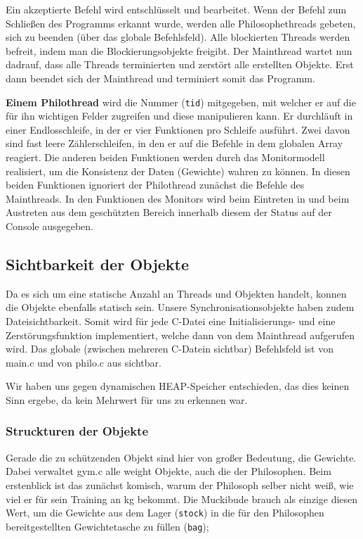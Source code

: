 \documentclass[
   draft=false
  ,paper=a4
  ,twoside=false
  ,fontsize=11pt
  ,headsepline
  ,BCOR10mm
  ,DIV11
  ,parskip=full+
]{scrartcl} %
\begin{document}
Ein akzeptierte Befehl wird entschlüsselt und
bearbeitet. Wenn der Befehl zum Schließen des Programms erkannt wurde, werden
alle Philosophethreads gebeten, sich zu beenden (über das globale
Befehlsfeld). Alle blockierten Threads werden befreit, indem man die
Blockierungsobjekte freigibt. Der Mainthread wartet nun dadrauf, dass alle
Threads terminierten und zerstört alle erstellten Objekte. Erst dann beendet
sich der Mainthread und terminiert somit das Programm.

\textbf{Einem Philothread} wird die Nummer (\texttt{tid}) mitgegeben, mit
welcher er auf die für ihn wichtigen Felder zugreifen und diese manipulieren kann.
Er durchläuft in einer Endlosschleife, in der er vier Funktionen pro Schleife
ausführt. Zwei davon sind fast leere Zählerschleifen, in den er auf die
Befehle in dem globalen Array reagiert. Die anderen beiden Funktionen werden
durch das Monitormodell realisiert, um die Konsistenz der Daten (Gewichte)
wahren zu können. In diesen beiden Funktionen ignoriert der Philothread zunächst die
Befehle des Mainthreads. In den Funktionen des Monitors wird beim Eintreten in
und beim Austreten aus dem geschützten Bereich innerhalb diesem der Status auf
der Console ausgegeben.

\subsection{Sichtbarkeit der Objekte}
  Da es sich um eine statische Anzahl an Threads und Objekten handelt, konnen
  die Objekte ebenfalls statisch sein. Unsere Synchronisationsobjekte haben
  zudem Dateisichtbarkeit. Somit wird für jede C-Datei eine Initialisierungs-
  und eine Zerstörungsfunktion implementiert, welche dann von dem Mainthread
  aufgerufen wird.
  Das globale (zwischen mehreren C-Datein sichtbar) Befehlsfeld ist von
  main.c und von philo.c aus sichtbar.

  Wir haben uns gegen dynamischen HEAP-Speicher entschieden, das dies keinen
  Sinn ergebe, da kein Mehrwert für uns zu erkennen war.

\subsubsection{Struckturen der Objekte}

Gerade die zu schützenden Objekt sind hier von großer Bedeutung, die Gewichte.
Dabei verwaltet gym.c alle weight Objekte, auch die der Philosophen.
Beim erstenblick ist das zunächst komisch, warum der Philosoph selber nicht
weiß, wie viel er für sein Training an kg bekommt. Die Muckibude brauch als
einzige diesen Wert, um die Gewichte aus dem Lager (\texttt{stock}) in die für
den Philosophen bereitgestellten Gewichtetasche zu füllen (\texttt{bag});
\end{document}
